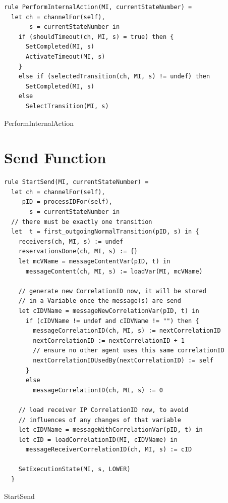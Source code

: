 \begin{listing}[H]
\begin{verbatim}
rule PerformInternalAction(MI, currentStateNumber) =
  let ch = channelFor(self),
       s = currentStateNumber in
    if (shouldTimeout(ch, MI, s) = true) then {
      SetCompleted(MI, s)
      ActivateTimeout(MI, s)
    }
    else if (selectedTransition(ch, MI, s) != undef) then
      SetCompleted(MI, s)
    else
      SelectTransition(MI, s)
\end{verbatim}
\caption{PerformInternalAction}
\label{lst:asm:PerformInternalAction}
\end{listing}







\section{Send Function}


\begin{listing}[H]
\begin{verbatim}
rule StartSend(MI, currentStateNumber) =
  let ch = channelFor(self),
     pID = processIDFor(self),
       s = currentStateNumber in
  // there must be exactly one transition
  let  t = first_outgoingNormalTransition(pID, s) in {
    receivers(ch, MI, s) := undef
    reservationsDone(ch, MI, s) := {}
    let mcVName = messageContentVar(pID, t) in
      messageContent(ch, MI, s) := loadVar(MI, mcVName)

    // generate new CorrelationID now, it will be stored
    // in a Variable once the message(s) are send
    let cIDVName = messageNewCorrelationVar(pID, t) in
      if (cIDVName != undef and cIDVName != "") then {
        messageCorrelationID(ch, MI, s) := nextCorrelationID
        nextCorrelationID := nextCorrelationID + 1
        // ensure no other agent uses this same correlationID
        nextCorrelationIDUsedBy(nextCorrelationID) := self
      }
      else
        messageCorrelationID(ch, MI, s) := 0

    // load receiver IP CorrelationID now, to avoid
    // influences of any changes of that variable
    let cIDVName = messageWithCorrelationVar(pID, t) in
    let cID = loadCorrelationID(MI, cIDVName) in
      messageReceiverCorrelationID(ch, MI, s) := cID

    SetExecutionState(MI, s, LOWER)
  }
\end{verbatim}
\caption{StartSend}
\label{lst:asm:StartSend}
\end{listing}




